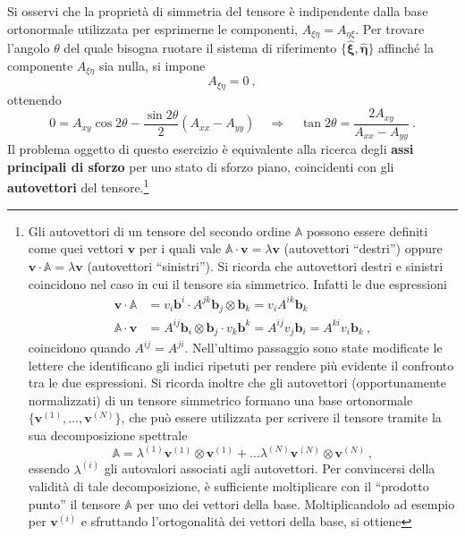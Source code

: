 Si osservi che la proprietà di simmetria del tensore è indipendente dalla base ortonormale utilizzata per esprimerne le componenti, $A_{\xi \eta} = A_{\eta \xi}$.
Per trovare l'angolo $\theta$ del quale bisogna ruotare il sistema di riferimento $\{\bm{\hat{\xi}},\bm{\hat{\eta}} \}$ affinché la componente $A_{\xi \eta}$ sia nulla, si impone
  \begin{equation}
   A_{\xi \eta} = 0 \ ,
  \end{equation}
ottenendo
  \begin{equation}
   0 = A_{xy} \cos {2\theta} - \dfrac{\sin{2\theta}}{2} (A_{xx}-A_{yy}) \quad \Rightarrow \quad
   \tan {2 \theta} = \dfrac{2 A_{xy}}{A_{xx}-A_{yy}} \ .
  \end{equation}
 Il problema oggetto di questo esercizio è equivalente alla ricerca degli \textbf{assi principali di sforzo} per uno stato di sforzo piano, coincidenti con gli \textbf{autovettori} del tensore.\footnote{
     Gli autovettori di un tensore del secondo ordine $\mathbb{A}$ possono essere definiti come quei vettori $\bm{v}$ per i quali vale $\mathbb{A} \cdot \bm{v} = \lambda \bm{v}$ (autovettori ``destri'') oppure $\bm{v} \cdot \mathbb{A} = \lambda \bm{v}$ (autovettori ``sinistri''). Si ricorda che autovettori destri e sinistri coincidono nel caso in cui il tensore sia simmetrico. Infatti le due espressioni
\begin{equation}
\begin{aligned}
    \bm{v} \cdot \mathbb{A} & = v_i \bm{b}^i \cdot A^{jk} \bm{b}_j \otimes \bm{b}_k = 
    v_i A^{ik} \bm{b}_k \\
    \mathbb{A} \cdot \bm{v} & = A^{ij} \bm{b}_i \otimes \bm{b}_j \cdot v_k \bm{b}^k  = 
    A^{ij} v_j \bm{b}_i = A^{ki} v_i \bm{b}_k \ ,
\end{aligned}
\end{equation}
coincidono quando $A^{ij} = A^{ji}$. Nell'ultimo passaggio sono state modificate le lettere che identificano gli indici ripetuti per rendere più evidente il confronto tra le due espressioni.
Si ricorda inoltre che gli autovettori (opportunamente normalizzati) di un tensore simmetrico formano una base ortonormale $\{ \bm{v}^{(1)} , \dots , \bm{v}^{(N)} \}$, che può essere utilizzata per scrivere il tensore tramite la sua decomposizione spettrale
\begin{equation}
 \mathbb{A} = \lambda^{(1)} \bm{v}^{(1)} \otimes \bm{v}^{(1)} + \dots
              \lambda^{(N)} \bm{v}^{(N)} \otimes \bm{v}^{(N)} \ ,
\end{equation}
essendo $\lambda^{(i)}$ gli autovalori associati agli autovettori. Per convincersi della validità di tale decomposizione, è sufficiente moltiplicare con il ``prodotto punto'' il tensore $\mathbb{A}$ per uno dei vettori della base. Moltiplicandolo ad esempio per $\bm{v}^{(i)}$ e sfruttando l'ortogonalità dei vettori della base, si ottiene
}
